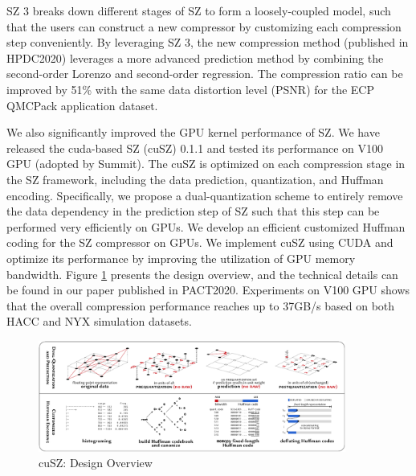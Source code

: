 SZ 3 breaks down different stages of SZ to form a loosely-coupled model, such that the users can construct a new compressor by customizing each compression step conveniently. By leveraging SZ 3, the new compression method (published in HPDC2020) leverages a more advanced prediction method by combining the second-order Lorenzo and second-order regression. %
The compression ratio can be improved by 51\% with the same data distortion level (PSNR) for the ECP QMCPack application dataset.  


We also significantly improved the GPU kernel performance of SZ. We have released the cuda-based SZ (cuSZ) 0.1.1 and tested its performance on V100 GPU (adopted by Summit). The cuSZ is optimized on each compression stage in the SZ framework, including the data prediction, quantization, and Huffman encoding. Specifically, we propose a dual-quantization scheme to entirely remove the data dependency in the prediction step of SZ such that this step can be performed very efficiently on GPUs. We develop an efficient customized Huffman coding for the SZ compressor on GPUs. We implement cuSZ using CUDA and optimize its performance by improving the utilization of GPU memory bandwidth. Figure \ref{fig:cuSZ:arch} presents the design overview, and the technical details can be found in our paper published in PACT2020. Experiments on V100 GPU shows that the overall compression performance reaches up to 37GB/s based on both HACC and NYX simulation datasets.

\begin{figure}
  \includegraphics[width=0.9\textwidth]{projects/2.3.4-DataViz/2.3.4.14-VeloC-SZ/200718_workflow.pdf}
  \caption{cuSZ: Design Overview}%
  \label{fig:cuSZ:arch}%
  \vspace{-2mm}
\end{figure}

